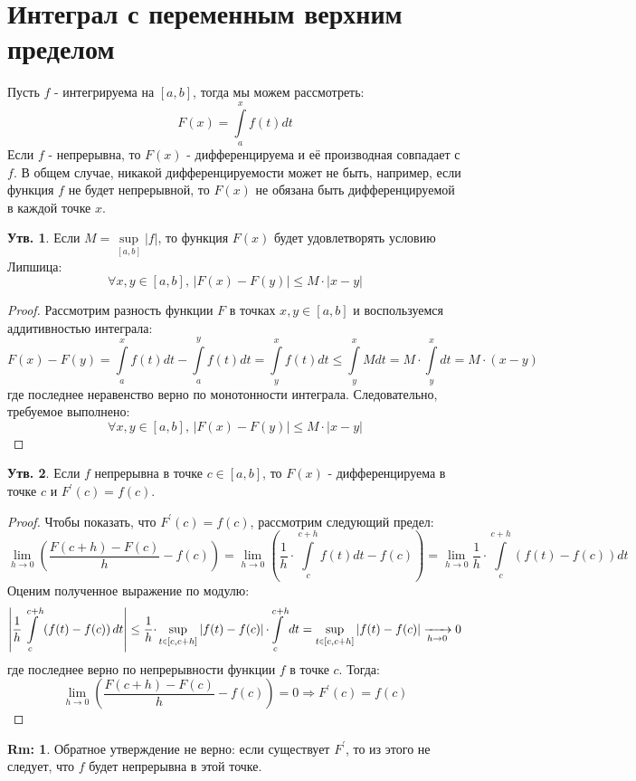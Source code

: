 \documentclass[12pt]{article}
\theoremstyle{definition}
\newtheorem{rem}{Rm:}
\newtheorem{prop}{Утв.}
\newcommand{\ddint}[2]{\displaystyle\int\limits_{#1}^{#2}}
\newcommand{\smallerrel}[1]{\mathrel{\mathpalette\smallerrelaux{#1}}}
\newcommand{\smallerrelaux}[2]{\raisebox{.1ex}{\scalebox{.75}{$#1#2$}}}
\newcommand{\smallin}{\smallerrel{\in}}
\begin{document}
\section*{Интеграл с переменным верхним пределом}
Пусть $f$ - интегрируема на $[a,b]$, тогда мы можем рассмотреть:
$$
	F(x) = \ddint{a}{x}f(t)dt
$$
Если $f$ - непрерывна, то $F(x)$ - дифференцируема и её производная совпадает с $f$. В общем случае, никакой дифференцируемости может не быть, например, если функция $f$ не будет непрерывной, то $F(x)$ не обязана быть дифференцируемой в каждой точке $x$.
\begin{prop}
	Если $M = \sup\limits_{[a,b]}|f|$, то функция $F(x)$ будет удовлетворять условию Липшица:
	$$
		\forall x,y \in [a,b], \, |F(x) - F(y)| \leq M{\cdot}|x - y|
	$$
\end{prop}
\begin{proof}
	Рассмотрим разность функции $F$ в точках $x,y \in [a,b]$ и воспользуемся аддитивностью интеграла:
	$$
		F(x) - F(y) = \ddint{a}{x}f(t)dt - \ddint{a}{y}f(t)dt = \ddint{y}{x}f(t)dt \leq \ddint{y}{x}Mdt = M{\cdot}\!\ddint{y}{x}dt = M{\cdot}(x-y)
	$$
	где последнее неравенство верно по монотонности интеграла. Следовательно, требуемое выполнено:
	$$
		\forall x,y \in [a,b], \, |F(x) - F(y)| \leq M{\cdot}|x-y|
	$$
\end{proof}
\begin{prop}
	Если $f$ непрерывна в точке $c \in [a,b]$, то $F(x)$ - дифференцируема в точке $c$ и $F^\prime(c) = f(c)$.
\end{prop}
\begin{proof}
	Чтобы показать, что $F^\prime(c) = f(c)$, рассмотрим следующий предел:
	$$
		\lim\limits_{h \to 0}\left(\dfrac{F(c+h) - F(c)}{h} - f(c)\right) = \lim\limits_{h \to 0}\left(\dfrac{1}{h}{\cdot}\!\ddint{c}{c+h}f(t)dt - f(c)\right) = \lim\limits_{h \to 0}\dfrac{1}{h}{\cdot}\!\ddint{c}{c+h}\left(f(t)- f(c)\right)dt
	$$
	Оценим полученное выражение по модулю:
	$$
		\left|\dfrac{1}{h}\ddint{c}{c+h}\left(f(t) - f(c)\right)dt\right| \leq \dfrac{1}{h}{\cdot}\sup\limits_{t \smallin [c, c+h]}\left|f(t) - f(c)\right|{\cdot}\!\ddint{c}{c+h}dt = \sup\limits_{t \smallin [c, c+h]}\left|f(t) - f(c)\right| \xrightarrow[h \to 0]{}0
	$$
	где последнее верно по непрерывности функции $f$ в точке $c$. Тогда:
	$$
		\lim\limits_{h \to 0}\left(\dfrac{F(c+h) - F(c)}{h} - f(c)\right) = 0 \Rightarrow F^\prime(c) = f(c)
	$$
\end{proof}
\begin{rem}
	Обратное утверждение не верно: если существует $F^\prime$, то из этого не следует, что $f$ будет непрерывна в этой точке.
\end{rem}
\end{document}
